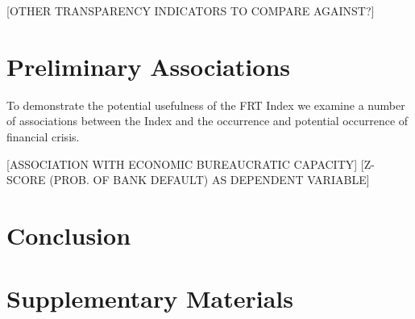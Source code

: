 \documentclass[a4paper]{article}
\begin{document}
[OTHER TRANSPARENCY INDICATORS TO COMPARE AGAINST?]

\section{Preliminary Associations}

To demonstrate the potential usefulness of the FRT Index we examine a number of associations between the Index and the occurrence and potential occurrence of financial crisis.

[ASSOCIATION WITH ECONOMIC BUREAUCRATIC CAPACITY]
[Z-SCORE (PROB. OF BANK DEFAULT) AS DEPENDENT VARIABLE]

\section*{Conclusion}




\section*{Supplementary Materials}

\end{document}
